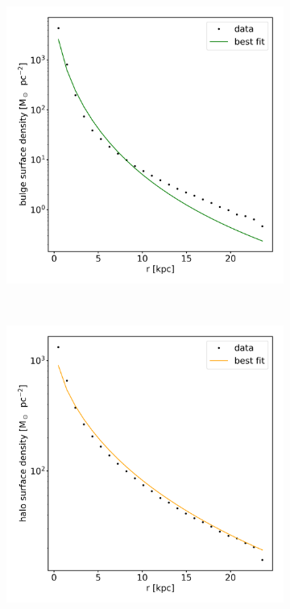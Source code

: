 \begin{figure}
\begin{subfigure}[b]{0.3\textwidth}
    \centering
    	\includegraphics[width=\textwidth]{plots/Auriga/surface_dens_spher_fit_data.png}
    	\label{fig:spher_surfdens_fit}
    \end{subfigure}
    ~ %
    \begin{subfigure}[b]{0.3\textwidth}
    \centering
    	\includegraphics[width=\textwidth]{plots/Auriga/surface_dens_halo_fit_data.png}
    	\label{fig:halo_surfdens_fit}
    \end{subfigure}
    

\end{figure}
